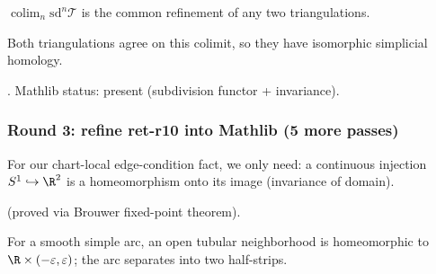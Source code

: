 \begin{lemma}
\label{lem:rcs-r13}
$\operatorname*{colim}_{n}\mathrm{sd}^{n}\mathcal{T}$ is the common refinement of any two triangulations.
\leanok
\end{lemma}

\begin{lemma}
\label{lem:rcs-r14}
Both triangulations agree on this colimit, so they have isomorphic simplicial homology.
\leanok
\end{lemma}

\begin{lemma}
\label{lem:rcs-r15}
.  Mathlib status: present (subdivision functor + invariance).
\leanok\mathlibok
\end{lemma}

\subsubsection*{Round 3: refine ret-r10 into Mathlib (5 more passes)}

\begin{lemma}
\label{lem:ret-r11}
For our chart-local edge-condition fact, we only need: a continuous injection $S^{1} \hookrightarrow \R^{2}$ is a homeomorphism onto its image (invariance of domain).
\leanok\mathlibok
\end{lemma}

\begin{lemma}
\label{lem:ret-r12}
 (proved via Brouwer fixed-point theorem).
\leanok\mathlibok
\end{lemma}

\begin{lemma}
\label{lem:ret-r13}
For a smooth simple arc, an open tubular neighborhood is homeomorphic to $\R\times(-\varepsilon, \varepsilon)$; the arc separates into two half-strips.
\leanok
\end{lemma}

